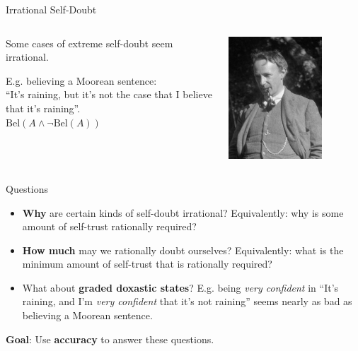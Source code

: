 \documentclass[aspectratio=169, dvipsnames]{beamer}
\begin{document}
\begin{frame}{Irrational Self-Doubt}
  \begin{columns}
    \begin{column}{.48\linewidth}
      Some cases of extreme self-doubt seem irrational.
      \vspace{20pt}
      
      E.g. believing a \alert{Moorean sentence}:\\
      ``It's raining, but it's not the case that I believe that it's raining''.\\
      $\text{Bel}(A \land \lnot \text{Bel}(A))$
    \end{column}
    \begin{column}{.48\linewidth}
      \begin{center}
      \includegraphics[width=0.7\textwidth]{GEMoore.jpg}
      \end{center}
    \end{column}
  \end{columns}
\end{frame}

\begin{frame}{Questions}
  \begin{itemize}
  \item \textbf{\alert{Why}} are certain kinds of self-doubt irrational? Equivalently: why is some amount of self-trust rationally
    required?
  \item \alert{\textbf{How much}} may we rationally doubt ourselves? Equivalently: what is the minimum amount of self-trust that is
    rationally required?
  \item What about \textbf{\alert{graded doxastic states}}? E.g. being \textit{very confident} in
    ``It's raining, and I'm \textit{very confident} that it's not raining'' seems nearly as bad as
    believing a Moorean sentence.
  \end{itemize}
  \textbf{Goal}: Use \textbf{\alert{accuracy}} to answer these questions.
\end{frame}
\end{document}
